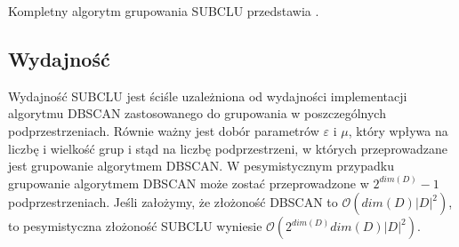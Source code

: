 Kompletny algorytm grupowania SUBCLU przedstawia .



\subsection{Wydajność}
Wydajność SUBCLU jest ściśle uzależniona od wydajności implementacji algorytmu DBSCAN zastosowanego do grupowania w poszczególnych podprzestrzeniach. Równie ważny jest dobór parametrów $ \varepsilon $ i $ \mu $, który wpływa na liczbę i wielkość grup i stąd na liczbę podprzestrzeni, w których przeprowadzane jest grupowanie algorytmem DBSCAN. W pesymistycznym przypadku grupowanie algorytmem DBSCAN może zostać przeprowadzone w $ 2^{dim(D)}-1 $ podprzestrzeniach. Jeśli założymy, że złożoność DBSCAN to $\mathcal{O}( dim(D)|D|^2 )$, to pesymistyczna złożoność SUBCLU wyniesie $ \mathcal{O}(2^{dim(D)}dim(D)|D|^2) $.
